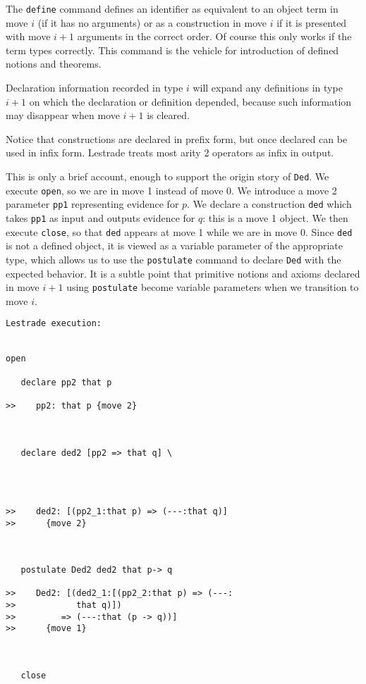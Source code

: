 \documentclass[12pt]{article}
\begin{document}
The {\tt define} command defines an identifier as equivalent to an object term in move $i$ (if it has no arguments) or as a construction in move $i$ if it is presented with
move $i+1$ arguments in the correct order.   Of course this only works if the term types correctly.  This command is the vehicle for introduction of defined notions and theorems.

Declaration information recorded in type $i$ will expand any definitions in type $i+1$ on which the declaration or definition depended, because such information may disappear
when move $i+1$ is cleared.

Notice that constructions are declared in prefix form, but once declared can be used in infix form.  Lestrade treats most arity 2 operators as infix in output.

This is only a brief account, enough to support the origin story of {\tt Ded}.  We execute {\tt open}, so we are in move 1 instead of move 0.  We introduce a move 2
parameter {\tt pp1} representing evidence for $p$.  We declare a construction {\tt ded} which takes {\tt pp1} as input and outputs evidence for $q$:  this is a move 1 object.
We then execute {\tt close}, so that {\tt ded} appears at move 1 while we are in move 0.  Since {\tt ded} is not a defined object, it is viewed as a variable parameter of the appropriate type,
which allows us to use the {\tt postulate} command to declare {\tt Ded} with the expected behavior.  It is a subtle point that primitive notions and axioms declared in move $i+1$ using
{\tt postulate} become variable parameters when we transition to move $i$.

\begin{verbatim}Lestrade execution:


open

   declare pp2 that p

>>    pp2: that p {move 2}



   declare ded2 [pp2 => that q] \
      



>>    ded2: [(pp2_1:that p) => (---:that q)]
>>      {move 2}



   postulate Ded2 ded2 that p-> q

>>    Ded2: [(ded2_1:[(pp2_2:that p) => (---:
>>            that q)])
>>         => (---:that (p -> q))]
>>      {move 1}



   close
\end{verbatim}
\end{document}

